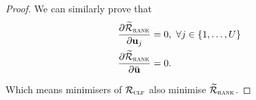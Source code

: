 \begin{proof}
We can similarly prove that 
\begin{equation*}
\begin{aligned}
\frac{\partial \widetilde\RCal_\textsc{rank}}{\partial \bu_j} &= 0, \ \forall j \in \{1,\dots,U\} \\
\frac{\partial \widetilde\RCal_\textsc{rank}}{\partial \widebar{\bu}} &= 0.
\end{aligned}
\end{equation*}

Which means minimisers of $\mathcal{R}_\textsc{clf}$ also minimise $\widetilde{\mathcal{R}}_\textsc{rank}$.

\end{proof}



